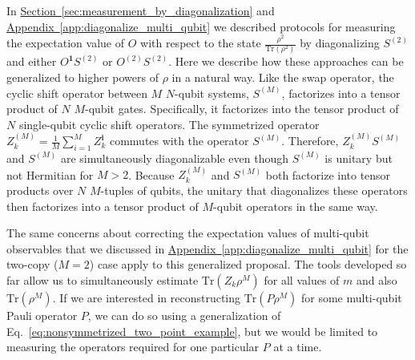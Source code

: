 \documentclass[
amsmath,
amssymb,
aps,
pra,
reprint,
twocolumn,
superscriptaddress,
longbibliography,
showkeys,
floatfix
]{revtex4-1}
\def\tr{\mathrm{Tr}}
\newcommand{\eq}[1]{Eq.~\hyperref[eq:#1]{\ref*{eq:#1}}}
\renewcommand{\sec}[1]{\hyperref[sec:#1]{Section~\ref*{sec:#1}}}
\newcommand{\app}[1]{\hyperref[app:#1]{Appendix~\ref*{app:#1}}}
\begin{document}
In \sec{measurement_by_diagonalization} and \app{diagonalize_multi_qubit} we
described protocols for measuring the expectation value of \(O\) with respect to
the state \(\frac{\rho^2}{\tr(\rho^2)}\) by diagonalizing \(S^{(2)}\) and either
\(O^\textbf{1}S^{(2)}\) or \(O^{(2)}S^{(2)}\). 
Here we describe how these approaches can be generalized to higher powers of
\(\rho\) in a natural way.
Like the swap operator, the cyclic shift operator between \(M\) \(N\)-qubit
systems, \(S^{(M)}\),
factorizes into a tensor product of \(N\) \(M\)-qubit gates. Specifically, it
factorizes into the tensor product of \(N\) single-qubit cyclic shift operators.
The symmetrized operator \(Z^{(M)}_k = \frac{1}{M} \sum_{i=1}^M Z^\textbf{i}_k\)
commutes with the operator \(S^{(M)}\). 
Therefore, \(Z_k^{(M)}S^{(M)}\) and \(S^{(M)}\) are simultaneously
diagonalizable even though \(S^{(M)}\) is unitary but not Hermitian for \(M >
2\).
Because \(Z_k^{(M)}\) and \(S^{(M)}\) both factorize into tensor products over
\(N\) \(M\)-tuples of qubits, the unitary that diagonalizes these operators then
factorizes into a tensor product of \(M\)-qubit operators in the same way.

The same concerns about correcting the expectation values of multi-qubit
observables that we discussed in \app{diagonalize_multi_qubit} for the two-copy
(\(M=2\)) case apply to this generalized proposal. 
The tools developed so far allow us to simultaneously estimate \(\tr(Z_k
\rho^M)\) for all values of \(m\) and also \(\tr(\rho^M)\). 
If we are interested in reconstructing \(\tr(P \rho^M)\) for some multi-qubit
Pauli operator \(P\), we can do so using a generalization of
\eq{nonsymmetrized_two_point_example}, but we would be limited to measuring the
operators required for one particular \(P\) at a time.
\end{document}
